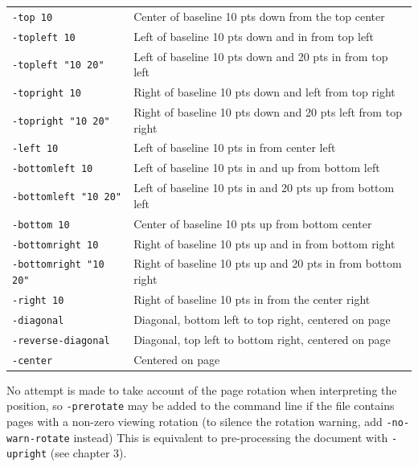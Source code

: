 \documentclass{book}
\begin{document}
  \begin{framed}
    \noindent\begin{tabular}{ll}
      \small\verb!-top 10! & Center of baseline 10 pts down from the top center \\
      \small\verb!-topleft 10! & Left of baseline 10 pts down and in from top left \\
      \small\verb!-topleft "10 20"! & Left of baseline 10 pts down and 20 pts in from top left \\
      \small\verb!-topright 10! & Right of baseline 10 pts down and left from top right\\
      \small\verb!-topright "10 20"! & Right of baseline 10 pts down and 20 pts left from top right\\
      \small\verb!-left 10! & Left of baseline 10 pts in from center left \\
      \small\verb!-bottomleft 10! & Left of baseline 10 pts in and up from bottom left \\
      \small\verb!-bottomleft "10 20"! & Left of baseline 10 pts in and 20 pts up from bottom left \\
      \small\verb!-bottom 10! & Center of baseline 10 pts up from bottom center\\
      \small\verb!-bottomright 10! & Right of baseline 10 pts up and in from bottom right \\
      \small\verb!-bottomright "10 20"! & Right of baseline 10 pts up and 20 pts in from bottom right \\
      \small\verb!-right 10! & Right of baseline 10 pts in from the center right \\
      \small\verb!-diagonal! & Diagonal, bottom left to top right, centered on page\\
      \small\verb!-reverse-diagonal! & Diagonal, top left to bottom right, centered on page\\    
      \small\verb!-center! & Centered on page\\
    \end{tabular}
  \end{framed}

\noindent No attempt is made to take account of the page rotation when interpreting the
position, so \texttt{-prerotate} may be added to the command line if the file
contains pages with a non-zero viewing rotation (to silence the rotation warning, add \texttt{-no-warn-rotate} instead) This is equivalent to
pre-processing the document with \texttt{-upright} (see chapter 3).
   
\end{document}

